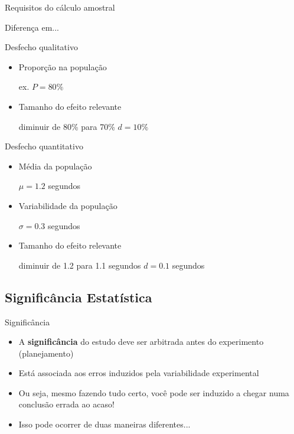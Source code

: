 \documentclass{beamer}
\begin{document}
\begin{frame}{\scriptsize Requisitos do cálculo amostral}
  \begin{block}{Diferença em...}
  \begin{block}{\scriptsize Desfecho qualitativo}
    \begin{itemize}
      \footnotesize
    \item Proporção na população

      {\tiny ex. $P = 80\%$}
    \item Tamanho do efeito relevante

      {\tiny diminuir de 80\% para 70\% \hfill $d=10\%$}
    \end{itemize}
  \end{block}
  \begin{block}{\scriptsize Desfecho quantitativo}
    \begin{itemize}
      \footnotesize
    \item Média da população

      {\tiny $\mu = 1.2$ segundos}
    \item Variabilidade da população

      {\tiny $\sigma = 0.3$ segundos}
    \item Tamanho do efeito relevante

      {\tiny diminuir de 1.2 para 1.1 segundos \hfill $d = 0.1$ segundos}
    \end{itemize}
  \end{block}
\end{block}
\end{frame}

\subsection[Significância]{Significância Estatística}
\begin{frame}{\scriptsize Significância}
  \begin{itemize}
    \footnotesize
  \item A {\bf significância} do estudo deve ser arbitrada antes do experimento (planejamento)
    \medskip
  \item Está associada aos erros induzidos pela variabilidade experimental
    \medskip
  \item Ou seja, mesmo fazendo tudo certo, você pode ser induzido a chegar numa conclusão errada ao acaso!
    \medskip
  \item Isso pode ocorrer de duas maneiras diferentes...
  \end{itemize}
\end{frame}
\end{document}
